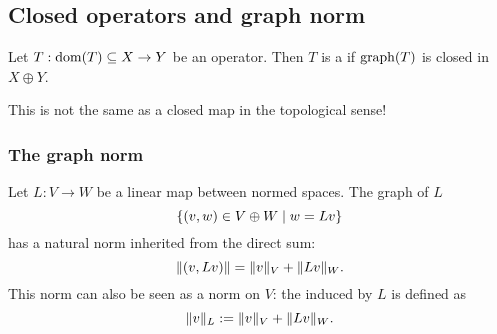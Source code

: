 \subsection{Closed operators and graph norm}
\begin{definition}
Let $T:\operatorname{dom}(T)\subseteq X\to Y$ be an operator. Then $T$ is a  if $\operatorname{graph}(T)$ is closed in $X\oplus Y$.
\end{definition}
This is not the same as a closed map in the topological sense!

\subsubsection{The graph norm}
Let $L:V\to W$ be a linear map between normed spaces. The graph of $L$
\[ \setbuilder{(v,w)\in V\oplus W}{w = Lv} \]
has a natural norm inherited from the direct sum:
\[ \lVert(v,Lv)\rVert = \lVert v\rVert_V + \lVert Lv\rVert_W. \]
This norm can also be seen as a norm on $V$: the  induced by $L$ is defined as
\[ \lVert v\rVert_L := \lVert v\rVert_V + \lVert Lv\rVert_W. \]

